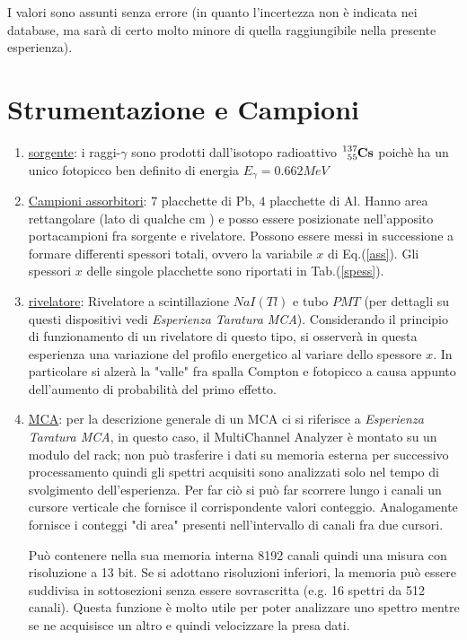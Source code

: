 \documentclass[12pt,a4paper,openright,twoside]{article}
\numberwithin{equation}{section} %
\begin{document}
I valori sono assunti senza errore (in quanto l'incertezza non è indicata nei database, ma sarà di certo molto minore di quella raggiungibile nella presente esperienza).


\section{Strumentazione e Campioni}

\begin{enumerate}
\item \underline{sorgente}: i raggi-$\gamma$ sono prodotti dall'isotopo radioattivo $\ce{^{137}_{55}\mathbf{Cs}}$ poichè ha un unico fotopicco ben definito di energia $E_{\gamma}=0.662 MeV$
\item \underline{Campioni assorbitori}: $7$ placchette di Pb, $4$ placchette di Al. Hanno area rettangolare (lato di qualche cm ) e posso essere posizionate nell'apposito portacampioni fra sorgente e rivelatore.
Possono essere messi in successione a formare differenti spessori totali, ovvero la variabile $x$ di Eq.(\ref{ass}).
Gli spessori $x$ delle singole placchette sono riportati in Tab.(\ref{spess}).
\item \underline{rivelatore}: Rivelatore a scintillazione $NaI(Tl)$ e tubo $PMT$ (per dettagli su questi dispositivi vedi \textit{Esperienza Taratura MCA}). Considerando il principio di funzionamento di un rivelatore di questo tipo, si osserverà in questa esperienza una variazione del profilo energetico al variare dello spessore $x$. In particolare si alzerà la "valle" fra spalla Compton e fotopicco a causa appunto dell'aumento di probabilità del primo effetto.

\item \underline{MCA}: per la descrizione generale di un MCA ci si riferisce a \textit{Esperienza Taratura MCA}, in questo caso, il MultiChannel Analyzer è montato su un modulo del rack; non può trasferire i dati su memoria esterna per successivo processamento quindi gli spettri acquisiti sono analizzati solo nel tempo di svolgimento dell'esperienza. Per far ciò si può far scorrere lungo i canali un cursore verticale che fornisce il corrispondente valori conteggio. Analogamente fornisce i conteggi "di area" presenti nell'intervallo di canali fra due cursori.

Può contenere nella sua memoria interna 8192 canali quindi una misura con risoluzione a 13 bit. Se si adottano risoluzioni inferiori, la memoria può essere suddivisa in sottosezioni senza essere sovrascritta (e.g. 16 spettri da 512 canali). Questa funzione è molto utile per poter analizzare uno spettro mentre se ne acquisisce un altro e quindi velocizzare la presa dati.


\end{enumerate}
\end{document}
